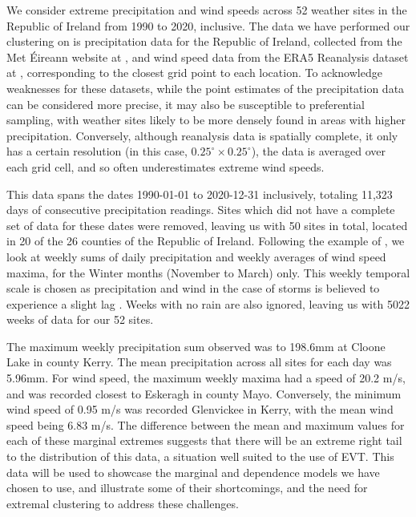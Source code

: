 \documentclass{article}
\numberwithin{equation}{section}
\begin{document}
We consider extreme precipitation and wind speeds across 52 weather sites in the Republic of Ireland from 1990 to 2020, inclusive.  
The data we have performed our clustering on is precipitation data for the Republic of Ireland, collected from the Met Éireann website at \citet{metHistoricalData}, and wind speed data from the ERA5 Reanalysis dataset at \citet{Hersbach2020}, corresponding to the closest grid point to each location.
To acknowledge weaknesses for these datasets, while the point estimates of the precipitation data can be considered more precise, it may also be susceptible to preferential sampling, with weather sites likely to be more densely found in areas with higher precipitation.
Conversely, although reanalysis data is spatially complete, it only has a certain resolution (in this case, $0.25^{\circ} \times 0.25^{\circ}$), the data is averaged over each grid cell, and so often underestimates extreme wind speeds. \cite{Gandoin2024}

This data spans the dates 1990-01-01 to 2020-12-31 inclusively, totaling 11,323 days of consecutive precipitation readings. 
Sites which did not have a complete set of data for these dates were removed, leaving us with 50 sites in total, located in 20 of the 26 counties of the Republic of Ireland. 
Following the example of \cite{Vignotto2021}, we look at weekly sums of daily precipitation and weekly averages of wind speed maxima, for the Winter months (November to March) only.
This weekly temporal scale is chosen as precipitation and wind in the case of storms is believed to experience a slight lag \citet{Bengtsson2009}.
Weeks with no rain are also ignored, leaving us with 5022 weeks of data for our 52 sites.

The maximum weekly precipitation sum observed was to 198.6mm at Cloone Lake in county Kerry. 
The mean precipitation across all sites for each day was 5.96mm.
For wind speed, the maximum weekly maxima had a speed of 20.2 m/s, and was recorded closest to Eskeragh in county Mayo.
Conversely, the minimum wind speed of 0.95 m/s was recorded Glenvickee in Kerry, with the mean wind speed being 6.83 m/s.
The difference between the mean and maximum values for each of these marginal extremes suggests that there will be an extreme right tail to the distribution of this data, a situation well suited to the use of EVT.
This data will be used to showcase the marginal and dependence models we have chosen to use, and illustrate some of their shortcomings, and the need for extremal clustering to address these challenges.
\end{document}
